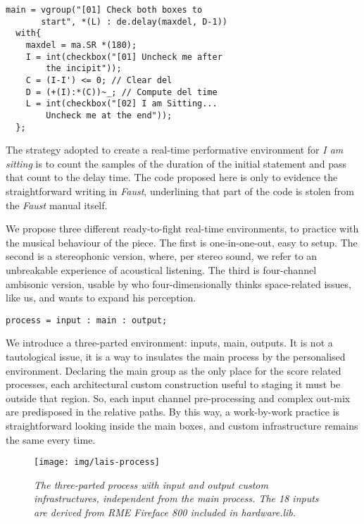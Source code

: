 \documentclass[twoside,a4paper]{article}
\begin{document}
\begin{lstlisting}
main = vgroup("[01] Check both boxes to
       start", *(L) : de.delay(maxdel, D-1))
  with{
    maxdel = ma.SR *(180);
    I = int(checkbox("[01] Uncheck me after
        the incipit"));
    C = (I-I') <= 0; // Clear del
    D = (+(I):*(C))~_; // Compute del time
    L = int(checkbox("[02] I am Sitting...
        Uncheck me at the end"));
  };
\end{lstlisting}

The strategy adopted to create a real-time performative environment for \emph{I
am sitting} is to count the samples of the duration of the initial statement and
pass that count to the delay time. The code proposed here is only to evidence
the straightforward writing in \emph{Faust}, underlining that part of the code
is stolen from the \emph{Faust} manual itself.

We propose three different ready-to-fight real-time environments, to practice
with the musical behaviour of the piece. The first is one-in-one-out, easy to
setup. The second is a stereophonic version, where, per stereo sound, we refer
to an unbreakable experience of acoustical listening. \cite{ab58} The third is
four-channel ambisonic version, usable by who four-dimensionally thinks
space-related issues, like us, and wants to expand his perception.

\begin{lstlisting}
process = input : main : output;
\end{lstlisting}

We introduce a three-parted environment: inputs, main, outputs. It is not a
tautological issue, it is a way to insulates the main process by the personalised
environment. Declaring the main group as the only place for the score related
processes, each architectural custom construction useful to staging it must be
outside that region. So, each input channel pre-processing and complex out-mix
are predisposed in the relative paths. By this way, a work-by-work practice is
straightforward looking inside the main boxes, and custom infrastructure remains
the same every time.

\begin{figure}[ht]
\centerline{\texttt{[image: img/lais-process]}}
\caption{\label{re-dia-6c}{\it The three-parted process with input and output
custom infrastructures, independent from the main process. The 18 inputs are
derived from \emph{RME Fireface 800} included in \emph{hardware.lib}.}}
\end{figure}
\end{document}
